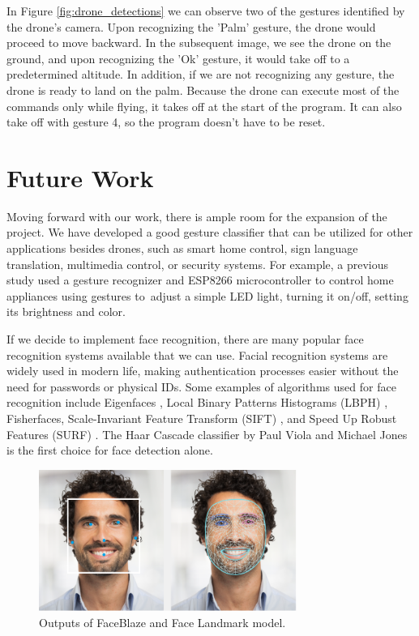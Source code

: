 In Figure \ref{fig:drone_detections} we can observe two of the gestures identified by the drone's camera. Upon recognizing the 'Palm' gesture, the drone would proceed to move backward. In the subsequent image, we see the drone on the ground, and upon recognizing the 'Ok' gesture, it would take off to a predetermined altitude.
In addition, if we are not recognizing any gesture, the drone is ready to land on the palm. Because the drone can execute most of the commands only while flying, it takes off at the start of the program. It can also take off with gesture 4, so the program doesn't have to be reset.


\section{Future Work}
Moving forward with our work, there is ample room for the expansion of the project. We have developed a good gesture classifier that can be utilized for other applications besides drones, such as smart home control, sign language translation, multimedia control, or security systems. For example, a previous study \cite{doi:10.1080/08839514.2023.2176607} used a gesture recognizer and ESP8266 microcontroller to control home appliances using gestures to~adjust a simple LED light, turning it on/off, setting its brightness and color.

If we decide to implement face recognition, there are many popular face recognition systems available that we can use. Facial recognition systems are widely used in modern life, making authentication processes easier without the need for passwords or physical IDs. Some examples of algorithms used for face recognition include Eigenfaces \cite{CARIKCI2012118}, Local Binary Patterns Histograms (LBPH) \cite{inproceedings}, Fisherfaces, Scale-Invariant Feature Transform (SIFT) \cite{articlefr}, and Speed Up Robust Features (SURF) \cite{10.1007/11744023_32}. The Haar Cascade classifier by Paul Viola and Michael Jones \cite{inproceedings} is the first choice for face detection alone.


\begin{figure}[h]
	\centering
	\includegraphics[width=0.75\textwidth]{images/face_landmark.png}
	\caption{Outputs of FaceBlaze and Face Landmark model.}
	\label{fig:face_landmark}
\end{figure}


